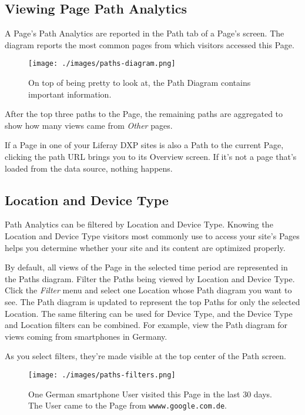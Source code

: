 \subsection{Viewing Page Path
Analytics}\label{viewing-page-path-analytics}

A Page's Path Analytics are reported in the Path tab of a Page's screen.
The diagram reports the most common pages from which visitors accessed
this Page.

\begin{figure}
\centering
\texttt{[image: ./images/paths-diagram.png]}
\caption{On top of being pretty to look at, the Path Diagram contains
important information.}
\end{figure}

After the top three paths to the Page, the remaining paths are
aggregated to show how many views came from \emph{Other} pages.

If a Page in one of your Liferay DXP sites is also a Path to the current
Page, clicking the path URL brings you to its Overview screen. If it's
not a page that's loaded from the data source, nothing happens.

\subsection{Location and Device Type}\label{location-and-device-type}

Path Analytics can be filtered by Location and Device Type. Knowing the
Location and Device Type visitors most commonly use to access your
site's Pages helps you determine whether your site and its content are
optimized properly.

By default, all views of the Page in the selected time period are
represented in the Paths diagram. Filter the Paths being viewed by
Location and Device Type. Click the \emph{Filter} menu and select one
Location whose Path diagram you want to see. The Path diagram is updated
to represent the top Paths for only the selected Location. The same
filtering can be used for Device Type, and the Device Type and Location
filters can be combined. For example, view the Path diagram for views
coming from smartphones in Germany.

As you select filters, they're made visible at the top center of the
Path screen.

\begin{figure}
\centering
\texttt{[image: ./images/paths-filters.png]}
\caption{One German smartphone User visited this Page in the last 30
days. The User came to the Page from \texttt{wwww.google.com.de}.}
\end{figure}

